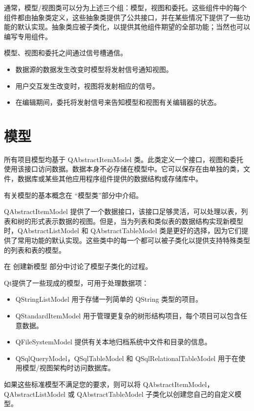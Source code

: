 通常，模型/视图类可以分为上述三个组：模型，视图和委托。这些组件中的每个组件都由抽象类定义，这些抽象类提供了公共接口，并在某些情况下提供了一些功能的默认实现。抽象类应被子类化，以提供其他组件期望的全部功能；当然也可以编写专用组件。

模型、视图和委托之间通过信号槽通信。

\begin{itemize}
\item 数据源的数据发生改变时模型将发射信号通知视图。
\item 用户交互发生改变时，视图将发射相应的信号。
\item 在编辑期间，委托将发射信号来告知模型和视图有关编辑器的状态。
\end{itemize}

\section{模型}

所有项目模型均基于 QAbstractItemModel 类。此类定义一个接口，视图和委托使用该接口访问数据。数据本身不必存储在模型中。它可以保存在由单独的类，文件，数据库或某些其他应用程序组件提供的数据结构或存储库中。


有关模型的基本概念在 “模型类”部分中介绍。


QAbstractItemModel 提供了一个数据接口，该接口足够灵活，可以处理以表，列表和树的形式表示数据的视图。但是，当为列表和类似表的数据结构实现新模型时，QAbstractListModel 和 QAbstractTableModel 类是更好的选择，因为它们提供了常用功能的默认实现。这些类中的每一个都可以被子类化以提供支持特殊类型的列表和表的模型。


在 创建新模型 部分中讨论了模型子类化的过程。


Qt提供了一些现成的模型，可用于处理数据项：


\begin{itemize}
\item QStringListModel 用于存储一列简单的 QString 类型的项目。
\item QStandardItemModel 用于管理更复杂的树形结构项目，每个项目可以包含任意数据。
\item QFileSystemModel 提供有关本地归档系统中文件和目录的信息。
\item QSqlQueryModel，QSqlTableModel 和 QSqlRelationalTableModel 用于在使用模型/视图架构时访问数据库。
\end{itemize}


如果这些标准模型不满足您的要求，则可以将 QAbstractItemModel，QAbstractListModel 或 QAbstractTableModel 子类化以创建您自己的自定义模型。

